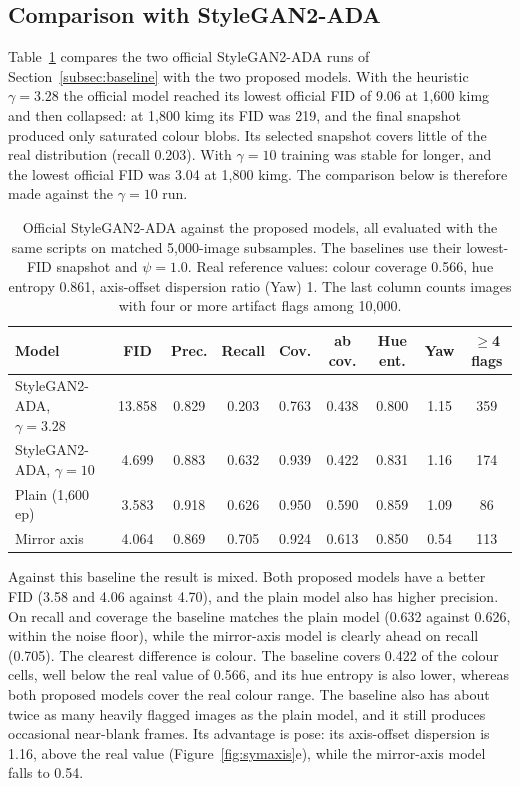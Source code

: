 \documentclass[electronics,article,submit,pdftex,moreauthors]{Definitions/mdpi}
\begin{document}
\subsection{Comparison with StyleGAN2-ADA}
\label{subsec:baseline_results}

Table~\ref{tab:baseline} compares the two official StyleGAN2-ADA runs of
Section~\ref{subsec:baseline} with the two proposed models. With the
heuristic $\gamma = 3.28$ the official model reached its lowest official FID
of 9.06 at 1,600 kimg and then collapsed: at 1,800 kimg its FID was 219, and
the final snapshot produced only saturated colour blobs. Its selected
snapshot covers little of the real distribution (recall 0.203). With
$\gamma = 10$ training was stable for longer, and the lowest official FID was
3.04 at 1,800 kimg. The comparison below is therefore made against the
$\gamma = 10$ run.

\begin{table}[H]
\caption{Official StyleGAN2-ADA against the proposed models, all evaluated with the
same scripts on matched 5,000-image subsamples. The baselines use their
lowest-FID snapshot and $\psi = 1.0$. Real reference values: colour
coverage 0.566, hue entropy 0.861, axis-offset dispersion ratio (Yaw) 1. The last column
counts images with four or more artifact flags among 10,000.}
\label{tab:baseline}
\small
\setlength{\tabcolsep}{3.5pt}
\begin{tabular}{lcccccccc}
\toprule
\textbf{Model} & \textbf{FID} & \textbf{Prec.} & \textbf{Recall} &
\textbf{Cov.} & \textbf{ab cov.} & \textbf{Hue ent.} & \textbf{Yaw} &
\textbf{$\geq$4 flags} \\
\midrule
StyleGAN2-ADA, $\gamma = 3.28$ & 13.858 & 0.829 & 0.203 & 0.763 & 0.438 & 0.800 & 1.15 & 359 \\
StyleGAN2-ADA, $\gamma = 10$   & 4.699  & 0.883 & 0.632 & 0.939 & 0.422 & 0.831 & 1.16 & 174 \\
Plain (1,600 ep) & 3.583  & 0.918 & 0.626 & 0.950 & 0.590 & 0.859 & 1.09 & 86  \\
Mirror axis & 4.064  & 0.869 & 0.705 & 0.924 & 0.613 & 0.850 & 0.54 & 113 \\
\bottomrule
\end{tabular}
\end{table}

Against this baseline the result is mixed. Both proposed models have a better
FID (3.58 and 4.06 against 4.70), and the plain model also has higher
precision. On recall and coverage the baseline matches the plain model (0.632
against 0.626, within the noise floor), while the mirror-axis model is
clearly ahead on recall (0.705). The clearest difference is colour. The
baseline covers 0.422 of the colour cells, well below the real value of
0.566, and its hue entropy is also lower, whereas both proposed models cover
the real colour range. The baseline also has about twice as many heavily
flagged images as the plain model, and it still produces occasional
near-blank frames. Its advantage is pose: its axis-offset dispersion is 1.16,
above the real value (Figure~\ref{fig:symaxis}e), while the
mirror-axis model falls to 0.54.
\end{document}
